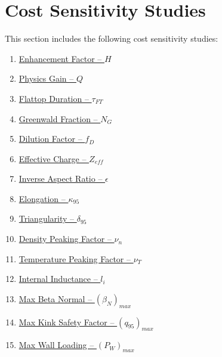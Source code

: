 \section{Cost Sensitivity Studies}
\label{section:studies}

This section includes the following cost sensitivity studies: ~

\begin{enumerate}
  \item \hyperref[subsection:sensitivity_H]{ Enhancement Factor -- $H$  }
  \item \hyperref[subsection:sensitivity_Q]{ Physics Gain -- $Q$  }
  \item \hyperref[subsection:sensitivity_tau_FT]{ Flattop Duration -- $\tau_{FT}$  }
  \item \hyperref[subsection:sensitivity_N_G]{ Greenwald Fraction -- $N_G$  }
  \item \hyperref[subsection:sensitivity_f_D]{ Dilution Factor -- $f_D$  }
  \item \hyperref[subsection:sensitivity_Z_eff]{ Effective Charge -- $Z_{eff}$  }
  \item \hyperref[subsection:sensitivity_epsilon]{ Inverse Aspect Ratio -- $\epsilon$  }
  \item \hyperref[subsection:sensitivity_kappa_95]{ Elongation -- $\kappa_{95}$  }
  \item \hyperref[subsection:sensitivity_delta_95]{ Triangularity -- $\delta_{95}$  }
  \item \hyperref[subsection:sensitivity_nu_n]{ Density Peaking Factor -- $\nu_n$  }
  \item \hyperref[subsection:sensitivity_nu_T]{ Temperature Peaking Factor -- $\nu_T$  }
  \item \hyperref[subsection:sensitivity_l_i]{ Internal Inductance -- $l_i$  }
  \item \hyperref[subsection:sensitivity_max_beta_N]{ Max Beta Normal -- $(\beta_N)_{max}$  }
  \item \hyperref[subsection:sensitivity_max_q_95]{ Max Kink Safety Factor -- $({q_{95}})_{max}$  }
  \item \hyperref[subsection:sensitivity_max_P_W]{ Max Wall Loading -- $({P_W})_{max}$ }
\end{enumerate}

\clearpage

\newpage

  \label{subsection:sensitivity_H}

